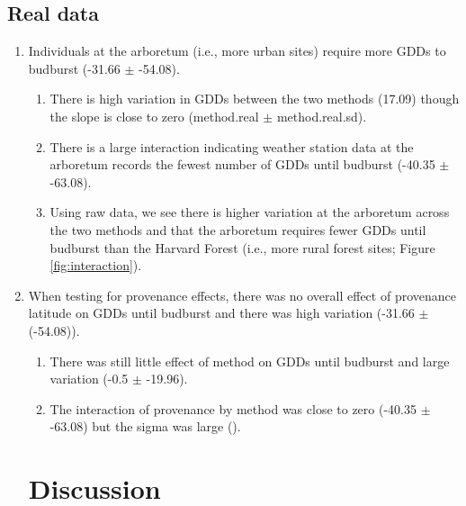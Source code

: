 \documentclass{article}\usepackage[]{graphicx}\usepackage[]{color}
\begin{document}
\subsection*{Real data}
\begin{enumerate}
\item Individuals at the arboretum (i.e., more urban sites) require more GDDs to budburst (-31.66 $\pm$ -54.08).
  \begin{enumerate}
  \item There is high variation in GDDs between the two methods (17.09) though the slope is close to zero (method.real $\pm$ method.real.sd).
  \item There is a large interaction indicating weather station data at the arboretum records the fewest number of GDDs until budburst (-40.35 $\pm$ -63.08). 
  \item Using raw data, we see there is higher variation at the arboretum across the two methods and that the arboretum requires fewer GDDs until budburst than the Harvard Forest (i.e., more rural forest sites; Figure \ref{fig:interaction}).
  \end{enumerate}

\item When testing for provenance effects, there was no overall effect of provenance latitude on GDDs until budburst and there was high variation (-31.66 $\pm$ (-54.08)).
  \begin{enumerate}
  \item There was still little effect of method on GDDs until budburst and large variation (-0.5 $\pm$ -19.96).
  \item The interaction of provenance by method was close to zero (-40.35 $\pm$ -63.08) but the sigma was large ().
\end{enumerate}

\section*{Discussion} 


\end{enumerate}
\end{document}
